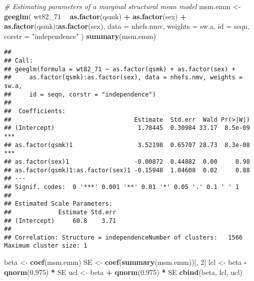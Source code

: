 \documentclass[
  10pt,
]{book}
\newenvironment{Shaded}{\begin{snugshade}}{\end{snugshade}}
\newcommand{\CommentTok}[1]{\textcolor[rgb]{0.56,0.35,0.01}{\textit{#1}}}
\newcommand{\DataTypeTok}[1]{\textcolor[rgb]{0.13,0.29,0.53}{#1}}
\newcommand{\DecValTok}[1]{\textcolor[rgb]{0.00,0.00,0.81}{#1}}
\newcommand{\FloatTok}[1]{\textcolor[rgb]{0.00,0.00,0.81}{#1}}
\newcommand{\KeywordTok}[1]{\textcolor[rgb]{0.13,0.29,0.53}{\textbf{#1}}}
\newcommand{\NormalTok}[1]{#1}
\newcommand{\OperatorTok}[1]{\textcolor[rgb]{0.81,0.36,0.00}{\textbf{#1}}}
\newcommand{\StringTok}[1]{\textcolor[rgb]{0.31,0.60,0.02}{#1}}
\begin{document}
\begin{Shaded}
\begin{Highlighting}[]
\CommentTok{# Estimating parameters of a marginal structural mean model}
\NormalTok{msm.emm <-}\StringTok{ }\KeywordTok{geeglm}\NormalTok{(}
\NormalTok{  wt82_}\DecValTok{71} \OperatorTok{~}\StringTok{ }\KeywordTok{as.factor}\NormalTok{(qsmk) }\OperatorTok{+}\StringTok{ }\KeywordTok{as.factor}\NormalTok{(sex)}
  \OperatorTok{+}\StringTok{ }\KeywordTok{as.factor}\NormalTok{(qsmk)}\OperatorTok{:}\KeywordTok{as.factor}\NormalTok{(sex),}
  \DataTypeTok{data =}\NormalTok{ nhefs.nmv,}
  \DataTypeTok{weights =}\NormalTok{ sw.a,}
  \DataTypeTok{id =}\NormalTok{ seqn,}
  \DataTypeTok{corstr =} \StringTok{"independence"}
\NormalTok{)}
\KeywordTok{summary}\NormalTok{(msm.emm)}
\end{Highlighting}
\end{Shaded}

\begin{verbatim}
## 
## Call:
## geeglm(formula = wt82_71 ~ as.factor(qsmk) + as.factor(sex) + 
##     as.factor(qsmk):as.factor(sex), data = nhefs.nmv, weights = sw.a, 
##     id = seqn, corstr = "independence")
## 
##  Coefficients:
##                                  Estimate  Std.err  Wald Pr(>|W|)    
## (Intercept)                       1.78445  0.30984 33.17  8.5e-09 ***
## as.factor(qsmk)1                  3.52198  0.65707 28.73  8.3e-08 ***
## as.factor(sex)1                  -0.00872  0.44882  0.00     0.98    
## as.factor(qsmk)1:as.factor(sex)1 -0.15948  1.04608  0.02     0.88    
## ---
## Signif. codes:  0 '***' 0.001 '**' 0.01 '*' 0.05 '.' 0.1 ' ' 1
## 
## Estimated Scale Parameters:
##             Estimate Std.err
## (Intercept)     60.8    3.71
## 
## Correlation: Structure = independenceNumber of clusters:   1566   Maximum cluster size: 1
\end{verbatim}

\begin{Shaded}
\begin{Highlighting}[]
\NormalTok{beta <-}\StringTok{ }\KeywordTok{coef}\NormalTok{(msm.emm)}
\NormalTok{SE <-}\StringTok{ }\KeywordTok{coef}\NormalTok{(}\KeywordTok{summary}\NormalTok{(msm.emm))[, }\DecValTok{2}\NormalTok{]}
\NormalTok{lcl <-}\StringTok{ }\NormalTok{beta }\OperatorTok{-}\StringTok{ }\KeywordTok{qnorm}\NormalTok{(}\FloatTok{0.975}\NormalTok{) }\OperatorTok{*}\StringTok{ }\NormalTok{SE}
\NormalTok{ucl <-}\StringTok{ }\NormalTok{beta }\OperatorTok{+}\StringTok{ }\KeywordTok{qnorm}\NormalTok{(}\FloatTok{0.975}\NormalTok{) }\OperatorTok{*}\StringTok{ }\NormalTok{SE}
\KeywordTok{cbind}\NormalTok{(beta, lcl, ucl)}
\end{Highlighting}
\end{Shaded}
\end{document}
